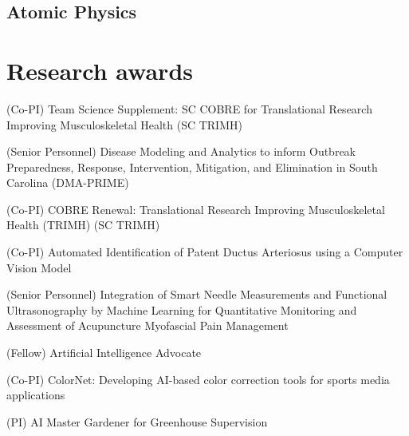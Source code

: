\documentclass[11pt,letterpaper,roman]{moderncv}        %
\begin{document}
\begin{refsection}
  \nocite{*}
  \printbibliography[heading=none]
\end{refsection}

\subsection{Atomic Physics}

\begin{refsection}
  \nocite{*}
  \printbibliography[heading=none]
\end{refsection}

\section{Research awards}

\quad (Co-PI) Team Science Supplement: SC COBRE for Translational Research Improving Musculoskeletal Health (SC TRIMH)

\quad (Senior Personnel) Disease Modeling and Analytics to inform Outbreak Preparedness, Response, Intervention, Mitigation, and Elimination in South Carolina (DMA-PRIME)

\quad (Co-PI) COBRE Renewal: Translational Research Improving Musculoskeletal Health (TRIMH) (SC TRIMH)

\quad (Co-PI) Automated Identification of Patent Ductus Arteriosus using a Computer Vision Model

\quad (Senior Personnel) Integration of Smart Needle Measurements and Functional Ultrasonography by Machine Learning for Quantitative Monitoring and Assessment of Acupuncture Myofascial Pain Management

\quad (Fellow) Artificial Intelligence Advocate

\quad (Co-PI) ColorNet: Developing AI-based color correction tools for sports media applications

\quad (PI) AI Master Gardener for Greenhouse Supervision
\end{document}
